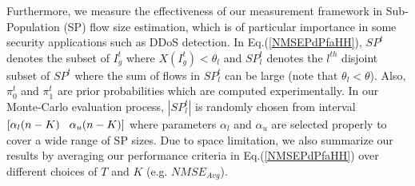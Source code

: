 Furthermore, we measure the effectiveness of our measurement framework in Sub-Population (SP) flow size estimation, which is of particular importance in some security applications such as DDoS detection. In Eq.(\ref{NMSEPdPfaHH}), $SP^{t}$ denotes the subset of $I_{g}^{t}$ where $X(I_{g}^{t})< \theta_{l}$ and $SP^{t}_{l}$ denotes the $l^{th}$ disjoint subset of $SP^{t}$ where the sum of flows in $SP^{t}_{l}$ can be large (note that $\theta_{l}<\theta$). Also, $\pi_{0}^{t}$ and $\pi_{1}^{t}$ are prior probabilities which are computed experimentally. In our Monte-Carlo evaluation process, $\left|SP_{l}^{t}\right|$ is randomly chosen from interval $[\alpha_{l}(n-K) \hspace{0.3cm} \alpha_{u} (n-K)]$ where parameters $\alpha_{l}$ and $\alpha_{u}$ are selected properly to cover a wide range of SP sizes. Due to space limitation, we also summarize our results by averaging our performance criteria in Eq.(\ref{NMSEPdPfaHH}) over different choices of $T$ and $K$ (e.g. $NMSE_{Avg}$).

